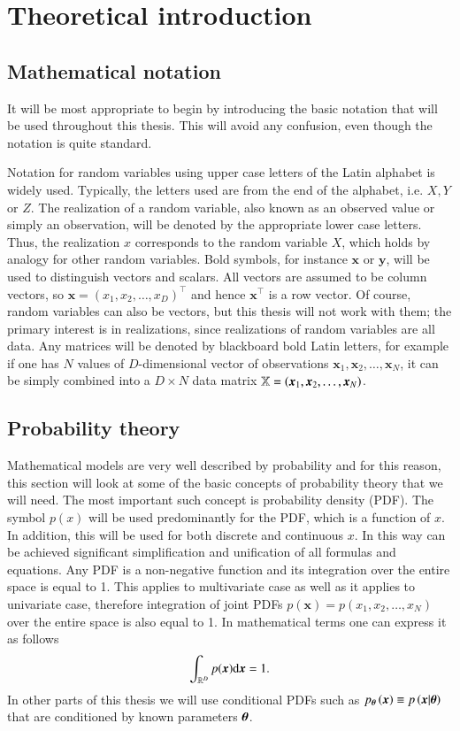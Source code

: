 \chapter{Theoretical introduction}

\section{Mathematical notation}\label{sec:terminology}
It will be most appropriate to begin by introducing the basic notation that will be used throughout this thesis. This will avoid any confusion, even though the notation is quite standard. 

Notation for random variables using upper case letters of the Latin alphabet is widely used. Typically, the letters used are from the end of the alphabet, i.e. $X,Y$ or $Z$. The realization of a random variable, also known as an observed value or simply an observation, will be denoted by the appropriate lower case letters. Thus, the realization  $x$ corresponds to the random variable $X$, which holds by analogy for other random variables. Bold symbols, for instance $\boldsymbol{x}$ or $\boldsymbol{y}$, will be used to distinguish vectors and scalars. All vectors are assumed to be column vectors, so $\boldsymbol{x} = \left(x_1,x_2,\dots,x_D\right)^\top$ and hence $\boldsymbol{x}^\top$ is a row vector. Of course, random variables can also be vectors, but this thesis will not work with them; the primary interest is in realizations, since realizations of random variables are all data. Any matrices will be denoted by blackboard bold Latin letters, for example if one has $N$ values of $D$-dimensional vector of observations $\boldsymbol{x}_1,\boldsymbol{x}_2,\dots,\boldsymbol{x}_N$, it can be simply combined into a $D \times N$ data matrix $\mathbb{X}=\left(\boldsymbol{x}_{1},\boldsymbol{x}_{2},\dots,\boldsymbol{x}_{N}\right)$. 



\section{Probability theory}
Mathematical models are very well described by probability and for this reason, this section will look at some of the basic concepts of probability theory that we will need. The most important such concept is probability density (PDF). 
The symbol $p(x)$ will be used predominantly for the PDF, which is a function of $x$.  In addition, this will be used for both discrete and continuous $x$. In this way can be achieved significant simplification and unification of all formulas and equations. Any PDF is a non-negative function and its integration over the entire space is equal to 1. This applies to multivariate case as well as it applies to univariate case, therefore integration of joint PDFs $p(\boldsymbol{x}) = p\left(x_1, x_2, \dots, x_N\right)$ over the entire space is also equal to 1. In mathematical terms one can express it as follows
\begin{equation}
    \int_{\mathbb{R}^D}p(\boldsymbol{x})\mathrm{d}{\boldsymbol{x}} = 1.
\end{equation}
In other parts of this thesis we will use conditional PDFs such as $p_{
\boldsymbol{\theta}}\left(\boldsymbol{x}\right) \equiv p\left(\boldsymbol{x}|\boldsymbol{\theta}\right)  $ that are conditioned by known parameters $\boldsymbol{\theta}$. 

